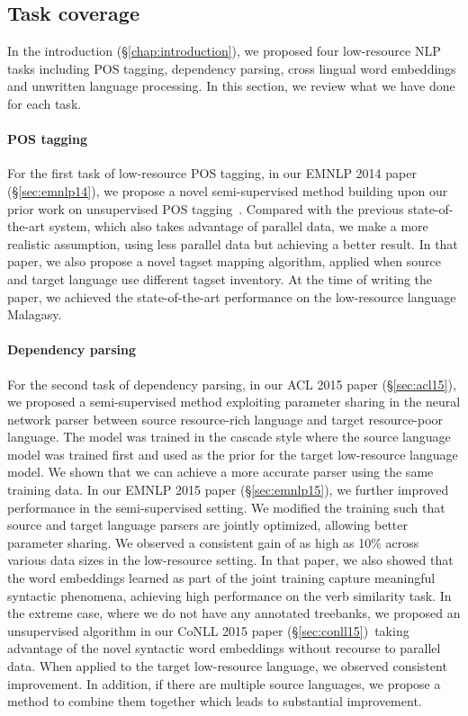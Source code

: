 \documentclass[12pt,twoside,final,hidelinks]{ltthesis}
\theoremstyle{definition}
\newcommand\emnlpivp{EMNLP 2014 paper (\S\ref{sec:emnlp14})}
\newcommand\conllvp{CoNLL 2015 paper (\S\ref{sec:conll15})}
\newcommand\aclvp{ACL 2015 paper (\S\ref{sec:acl15})}
\newcommand\emnlpvp{EMNLP 2015 paper (\S\ref{sec:emnlp15})}
\begin{document}
\subsection{Task coverage}
\noindent In the introduction (\S\ref{chap:introduction}), we proposed four low-resource NLP tasks including POS tagging, dependency parsing, cross lingual word embeddings and unwritten language processing. In this section, we review what we have done for each task. 
\paragraph{POS tagging} For the first task of low-resource POS tagging, in our \emnlpivp, we propose a novel semi-supervised method building 
upon our prior work on unsupervised POS tagging~\cite{duongIJCNLP,Duongacl13}. Compared with 
the previous state-of-the-art system, which also takes advantage of parallel data, we make a more realistic assumption, using less parallel data but achieving a better result. 
In that paper, we also propose a novel tagset mapping algorithm, applied when source and target language use different tagset inventory. At the time of writing the paper, we achieved the state-of-the-art performance on the low-resource language Malagasy. 

\paragraph{Dependency parsing} For the second task of dependency parsing, in our \aclvp, we proposed a semi-supervised method exploiting parameter sharing in the 
neural network parser between source resource-rich language and target resource-poor language. The model was trained in the cascade style 
where the source language model was trained first and used as the prior for the target low-resource language model. We shown that we can achieve  a more accurate parser using the same training data. In our \emnlpvp, we further improved performance in the semi-supervised setting. We modified 
the training such that source and target language parsers are jointly optimized, allowing better parameter sharing. We observed a consistent gain
of as high as 10\% across various data sizes in the low-resource setting. In that paper, we also showed that the word embeddings learned as part 
of the joint training capture meaningful syntactic phenomena, achieving high performance on the verb similarity task. In the extreme case, where 
we do not have any annotated treebanks, we proposed an unsupervised algorithm in our \conllvp\ taking advantage of the novel syntactic word 
embeddings without recourse to parallel data. When applied to the target low-resource language, we observed consistent improvement. In addition, 
if there are multiple source languages, we propose a method to combine them together which leads to substantial improvement. 
\end{document}
